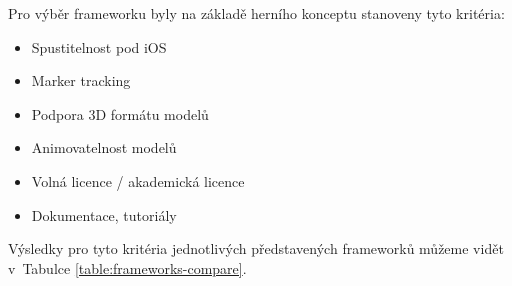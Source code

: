 \documentclass[twoside,12pt]{article}
\begin{document}
Pro výběr frameworku byly na základě herního konceptu stanoveny tyto kritéria:
\begin{itemize}
	\item Spustitelnost pod iOS
	\item Marker tracking
	\item Podpora 3D formátu modelů
	\item Animovatelnost modelů
	\item Volná licence / akademická licence
	\item Dokumentace, tutoriály
\end{itemize}

Výsledky pro tyto kritéria jednotlivých představených frameworků můžeme vidět v~Tabulce \ref{table:frameworks-compare}.

\end{document}
